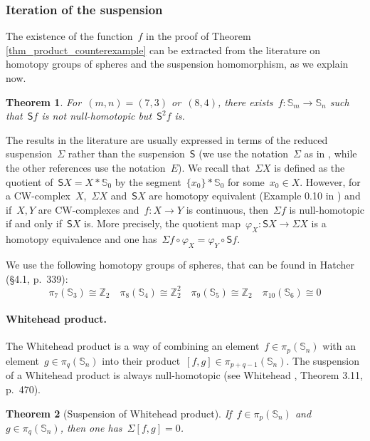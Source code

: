 \documentclass[english,11pt]{article}
\theoremstyle{plain}
\newtheorem{theorem}{Theorem}[section]
\theoremstyle{remark}
\theoremstyle{definition}
\newcommand{\Sp}{\mathbb{S}}
\newcommand{\Z}{\mathbb{Z}}
\newcommand{\sus}{\mathsf{S}}
\begin{document}
\subsubsection{Iteration of the suspension}\label{sec_suspension}
The existence of the function~$f$ in the proof of Theorem \ref{thm_product_counterexample} can be extracted from the literature on homotopy groups of spheres and the suspension homomorphism, as we explain now.
\begin{theorem}
For~$(m,n)=(7,3)$ or~$(8,4)$, there exists~$f:\Sp_m\to\Sp_n$ such that~$\sus f$ is not null-homotopic but~$\sus^2 f$ is.
\end{theorem}

The results in the literature are usually expressed in terms of the reduced suspension~$\Sigma$ rather than the suspension~$\sus$ (we use the notation~$\Sigma$ as in \cite{Hatcher02}, while the other references use the notation~$E$). We recall that~$\Sigma X$ is defined as the quotient of~$\sus X=X*\Sp_0$ by the segment~$\{x_0\}*\Sp_0$ for some~$x_0\in X$. However, for a CW-complex~$X$,~$\Sigma X$ and~$\sus X$ are homotopy equivalent (Example 0.10 in \cite{Hatcher02}) and if~$X,Y$ are CW-complexes and~$f:X\to Y$ is continuous, then~$\Sigma f$ is null-homotopic if and only if~$\sus X$ is. More precisely, the quotient map~$\varphi_X:\sus X\to\Sigma X$ is a homotopy equivalence and one has~$\Sigma f\circ \varphi_X=\varphi_Y\circ \sus f$.

We use the following homotopy groups of spheres, that can be found in Hatcher \cite{Hatcher02} (\S 4.1, p.~339):
\begin{equation*}
\pi_7(\Sp_3)\cong \Z_2\quad\pi_8(\Sp_4)\cong \Z_2^2\quad\pi_9(\Sp_5)\cong \Z_2\quad\pi_{10}(\Sp_6)\cong 0
\end{equation*}

\paragraph{Whitehead product.}
The Whitehead product is a way of combining an element~$f\in\pi_p(\Sp_n)$ with an element~$g\in\pi_q(\Sp_n)$ into their product~$[f,g]\in\pi_{p+q-1}(\Sp_n)$. The suspension of a Whitehead product is always null-homotopic (see Whitehead \cite{Whitehead46}, Theorem 3.11, p.~470).

\begin{theorem}[Suspension of Whitehead product]
If~$f\in\pi_p(\Sp_n)$ and~$g\in\pi_q(\Sp_n)$, then one has~$\Sigma [f,g]=0$.
\end{theorem}
\end{document}
